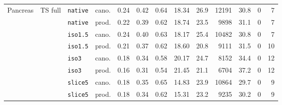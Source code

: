 \begin{tabular}{llllrrrrrrrrr}
\midrule
Pancreas & TS full & \texttt{native} & cano. & 0.24 & 0.42 & 0.64 & 18.34 & 26.9 & 12191 & 30.8 & 0 & 7 \\
 &  & \texttt{native} & prod. & 0.22 & 0.39 & 0.62 & 18.74 & 23.5 & 9898 & 31.1 & 0 & 7 \\
 &  & \texttt{iso1.5} & cano. & 0.24 & 0.40 & 0.63 & 18.17 & 25.4 & 10482 & 30.8 & 0 & 7 \\
 &  & \texttt{iso1.5} & prod. & 0.21 & 0.37 & 0.62 & 18.60 & 20.8 & 9111 & 31.5 & 0 & 10 \\
 &  & \texttt{iso3} & cano. & 0.18 & 0.34 & 0.58 & 20.17 & 24.7 & 8152 & 34.4 & 0 & 12 \\
 &  & \texttt{iso3} & prod. & 0.16 & 0.31 & 0.54 & 21.45 & 21.1 & 6704 & 37.2 & 0 & 12 \\
 &  & \texttt{slice5} & cano. & 0.18 & 0.35 & 0.65 & 14.83 & 23.9 & 10864 & 29.7 & 0 & 9 \\
 &  & \texttt{slice5} & prod. & 0.18 & 0.34 & 0.62 & 15.31 & 23.2 & 9235 & 30.2 & 0 & 9 \\
\bottomrule
\end{tabular}
